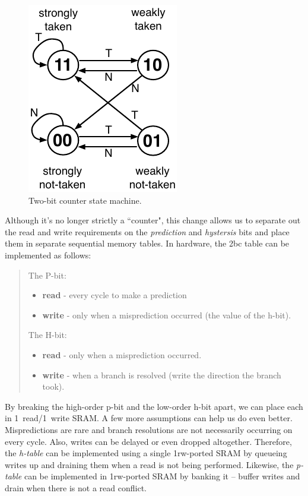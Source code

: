 \begin{figure}[ht]
	\centering
	\centerline{\includegraphics[scale =1] {figures/2bc-fsm}}
	\caption{ \small Two-bit counter state machine.}
	\label{fig:2bc-fsm}
\end{figure}

Although it's no longer strictly a ``counter", this change allows us to separate out the read and write requirements on the {\em prediction} and {\em hystersis} bits and place them in separate sequential memory tables. In hardware, the 2bc table can be implemented as follows:

\begin{quote}
The P-bit:
\begin{itemize}
\item {\bf read} - every cycle to make a prediction
\item {\bf write} - only when a misprediction occurred (the value of the h-bit).
\end{itemize}

The H-bit:

\begin{itemize}
\item {\bf read} - only when a misprediction occurred.
\item {\bf write} - when a branch is resolved (write the direction the branch took).
\end{itemize}
\end{quote}

By breaking the high-order p-bit and the low-order h-bit apart, we can place each in 1~read/1~write SRAM. A few more assumptions can help us do even better. Mispredictions are rare and branch resolutions are not necessarily occurring on every cycle. Also, writes can be delayed or even dropped altogether. Therefore, the {\em h-table} can be implemented using a single 1rw-ported SRAM by queueing writes up and draining them when a read is not being performed. Likewise, the {\em p-table} can be implemented in 1rw-ported SRAM by banking it -- buffer writes and drain when there is not a read conflict.



